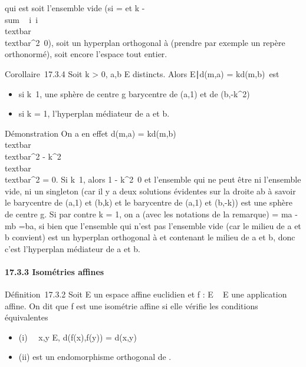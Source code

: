 qui est soit l'ensemble vide (si \overrightarrowu
= et k
-\\sum ~
i\inI\lambda~i\\textbar{}\overrightarrowaai\\textbar{}^2\neq~0),
soit un hyperplan orthogonal à \overrightarrowu
(prendre par exemple un repère orthonormé), soit encore l'espace tout
entier.

Corollaire~17.3.4 Soit k \textgreater{} 0, a,b \in E distincts. Alors
\m \in E∣d(m,a) =
kd(m,b)\ est

\begin{itemize}
\itemsep1pt\parskip0pt
\item
  si k\neq~1, une sphère de centre g barycentre
  de (a,1) et de (b,-k^2)
\item
  si k = 1, l'hyperplan médiateur de a et b.
\end{itemize}

Démonstration On a en effet d(m,a) = kd(m,b)
\Leftrightarrow
\\textbar{}\overrightarrowma\\textbar{}^2
-
k^2\\textbar{}\overrightarrowmb\\textbar{}^2
= 0. Si k\neq~1, alors 1 -
k^2\neq~0 et l'ensemble qui ne peut
être ni l'ensemble vide, ni un singleton (car il y a deux solutions
évidentes sur la droite ab à savoir le barycentre de (a,1) et (b,k) et
le barycentre de (a,1) et (b,-k)) est une sphère de centre g. Si par
contre k = 1, on a (avec les notations de la remarque)
\overrightarrowu =\overrightarrow
ma -\overrightarrow mb
=\overrightarrow ba, si bien que l'ensemble qui n'est
pas l'ensemble vide (car le milieu de a et b convient) est un hyperplan
orthogonal à \overrightarrowba et contenant le milieu
de a et b, donc c'est l'hyperplan médiateur de a et b.

\paragraph{17.3.3 Isométries affines}

Définition~17.3.2 Soit E un espace affine euclidien et f : E \rightarrow~ E une
application affine. On dit que f est une isométrie affine si elle
vérifie les conditions équivalentes

\begin{itemize}
\itemsep1pt\parskip0pt
\item
  (i) \forall~~x,y \in E, d(f(x),f(y)) = d(x,y)
\item
  (ii) \vecf est un endomorphisme orthogonal de
  \overrightarrowE.
\end{itemize}

